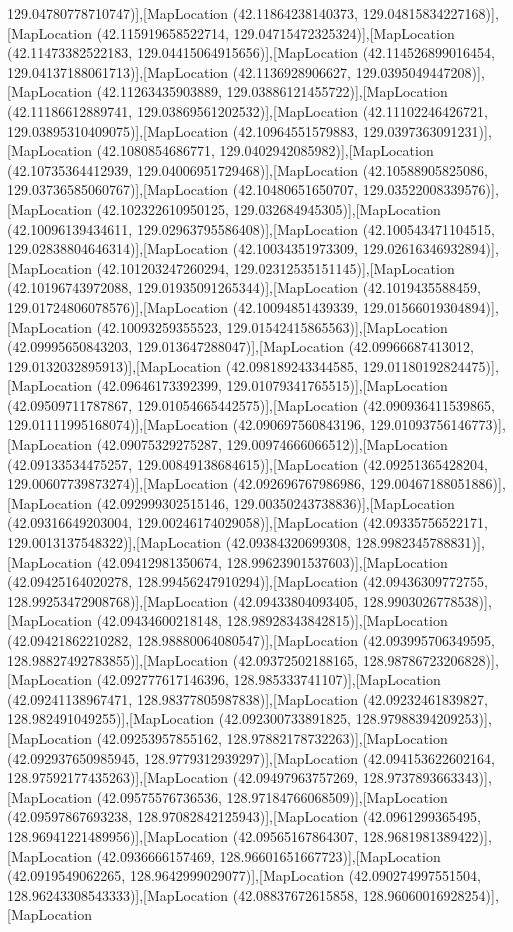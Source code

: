 129.04780778710747)],[MapLocation (42.11864238140373, 129.04815834227168)],[MapLocation (42.115919658522714, 129.04715472325324)],[MapLocation (42.11473382522183, 129.04415064915656)],[MapLocation (42.114526899016454, 129.04137188061713)],[MapLocation (42.1136928906627, 129.0395049447208)],[MapLocation (42.11263435903889, 129.03886121455722)],[MapLocation (42.11186612889741, 129.03869561202532)],[MapLocation (42.11102246426721, 129.03895310409075)],[MapLocation (42.10964551579883, 129.0397363091231)],[MapLocation (42.1080854686771, 129.0402942085982)],[MapLocation (42.10735364412939, 129.04006951729468)],[MapLocation (42.10588905825086, 129.03736585060767)],[MapLocation (42.10480651650707, 129.03522008339576)],[MapLocation (42.102322610950125, 129.032684945305)],[MapLocation (42.10096139434611, 129.02963795586408)],[MapLocation (42.100543471104515, 129.02838804646314)],[MapLocation (42.10034351973309, 129.02616346932894)],[MapLocation (42.101203247260294, 129.02312535151145)],[MapLocation (42.10196743972088, 129.01935091265344)],[MapLocation (42.1019435588459, 129.01724806078576)],[MapLocation (42.10094851439339, 129.01566019304894)],[MapLocation (42.10093259355523, 129.01542415865563)],[MapLocation (42.09995650843203, 129.013647288047)],[MapLocation (42.09966687413012, 129.0132032895913)],[MapLocation (42.098189243344585, 129.01180192824475)],[MapLocation (42.09646173392399, 129.01079341765515)],[MapLocation (42.09509711787867, 129.01054665442575)],[MapLocation (42.090936411539865, 129.01111995168074)],[MapLocation (42.090697560843196, 129.01093756146773)],[MapLocation (42.09075329275287, 129.00974666066512)],[MapLocation (42.09133534475257, 129.00849138684615)],[MapLocation (42.09251365428204, 129.00607739873274)],[MapLocation (42.092696767986986, 129.00467188051886)],[MapLocation (42.092999302515146, 129.00350243738836)],[MapLocation (42.09316649203004, 129.00246174029058)],[MapLocation (42.09335756522171, 129.0013137548322)],[MapLocation (42.09384320699308, 128.9982345788831)],[MapLocation (42.09412981350674, 128.99623901537603)],[MapLocation (42.09425164020278, 128.99456247910294)],[MapLocation (42.09436309772755, 128.99253472908768)],[MapLocation (42.09433804093405, 128.9903026778538)],[MapLocation (42.09434600218148, 128.98928343842815)],[MapLocation (42.09421862210282, 128.98880064080547)],[MapLocation (42.093995706349595, 128.98827492783855)],[MapLocation (42.09372502188165, 128.98786723206828)],[MapLocation (42.092777617146396, 128.985333741107)],[MapLocation (42.09241138967471, 128.98377805987838)],[MapLocation (42.09232461839827, 128.982491049255)],[MapLocation (42.092300733891825, 128.97988394209253)],[MapLocation (42.09253957855162, 128.97882178732263)],[MapLocation (42.092937650985945, 128.9779312939297)],[MapLocation (42.094153622602164, 128.97592177435263)],[MapLocation (42.09497963757269, 128.9737893663343)],[MapLocation (42.09575576736536, 128.97184766068509)],[MapLocation (42.09597867693238, 128.97082842125943)],[MapLocation (42.0961299365495, 128.96941221489956)],[MapLocation (42.09565167864307, 128.9681981389422)],[MapLocation (42.0936666157469, 128.96601651667723)],[MapLocation (42.0919549062265, 128.9642999029077)],[MapLocation (42.090274997551504, 128.96243308543333)],[MapLocation (42.08837672615858, 128.96060016928254)],[MapLocation 
